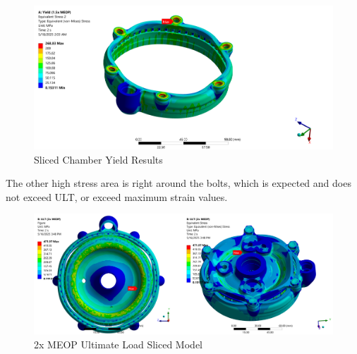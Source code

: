 \begin{figure}
    \centering
    \includegraphics[width=1\linewidth]{Sliced Chamber Yield Results.png}
    \caption{Sliced Chamber Yield Results}
    \label{fig:Sliced Chamber Yield Results}
\end{figure}
The other high stress area is right around the bolts, which is expected and does not exceed ULT, or exceed maximum strain values. 
\begin{figure}
    \centering
    \includegraphics[width=1\linewidth]{Images/2x MEOP Ultimate Load Sliced Model.png}
    \caption{2x MEOP Ultimate Load Sliced Model}
    \label{fig:2x MEOP Ultimate Load Sliced Model}
\end{figure}

